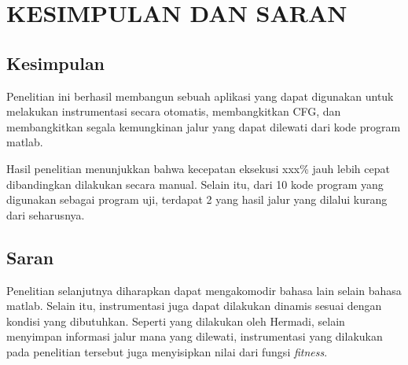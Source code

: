\section*{KESIMPULAN DAN SARAN}

\subsection*{Kesimpulan}

Penelitian ini berhasil membangun sebuah aplikasi yang dapat digunakan untuk melakukan instrumentasi secara otomatis, membangkitkan CFG, dan membangkitkan segala kemungkinan jalur yang dapat dilewati dari kode program matlab. 

Hasil penelitian menunjukkan bahwa kecepatan eksekusi xxx\% jauh lebih cepat dibandingkan dilakukan secara manual. Selain itu, dari 10 kode program yang digunakan sebagai program uji, terdapat 2 yang hasil jalur yang dilalui kurang dari seharusnya.

\subsection*{Saran}

Penelitian selanjutnya diharapkan dapat mengakomodir bahasa lain selain bahasa matlab. Selain itu, instrumentasi juga dapat dilakukan dinamis sesuai dengan kondisi yang dibutuhkan. Seperti yang dilakukan oleh Hermadi, selain menyimpan informasi jalur mana yang dilewati, instrumentasi yang dilakukan pada  penelitian tersebut juga menyisipkan nilai dari fungsi \textit{fitness}.